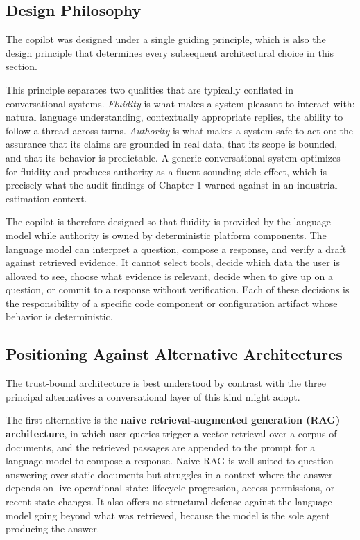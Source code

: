 \subsection*{Design Philosophy}
The copilot was designed under a single guiding principle, which is also the design principle that determines every subsequent architectural choice in this section.

\begin{center}
\end{center}

This principle separates two qualities that are typically conflated in conversational systems. \textit{Fluidity} is what makes a system pleasant to interact with: natural language understanding, contextually appropriate replies, the ability to follow a thread across turns. \textit{Authority} is what makes a system safe to act on: the assurance that its claims are grounded in real data, that its scope is bounded, and that its behavior is predictable. A generic conversational system optimizes for fluidity and produces authority as a fluent-sounding side effect, which is precisely what the audit findings of Chapter 1 warned against in an industrial estimation context.

The copilot is therefore designed so that fluidity is provided by the language model while authority is owned by deterministic platform components. The language model can interpret a question, compose a response, and verify a draft against retrieved evidence. It cannot select tools, decide which data the user is allowed to see, choose what evidence is relevant, decide when to give up on a question, or commit to a response without verification. Each of these decisions is the responsibility of a specific code component or configuration artifact whose behavior is deterministic.

\subsection*{Positioning Against Alternative Architectures}
The trust-bound architecture is best understood by contrast with the three principal alternatives a conversational layer of this kind might adopt.

The first alternative is the \textbf{naive retrieval-augmented generation (RAG) architecture}, in which user queries trigger a vector retrieval over a corpus of documents, and the retrieved passages are appended to the prompt for a language model to compose a response. Naive RAG is well suited to question-answering over static documents but struggles in a context where the answer depends on live operational state: lifecycle progression, access permissions, or recent state changes. It also offers no structural defense against the language model going beyond what was retrieved, because the model is the sole agent producing the answer.

